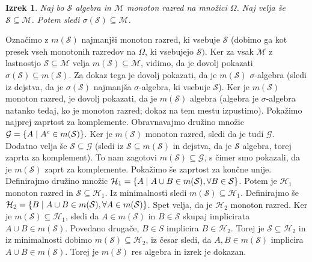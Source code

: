 \documentclass[12pt,a4paper]{amsart}
\theoremstyle{definition} %
\theoremstyle{plain} %
\newtheorem{izrek}[definicija]{Izrek}
\begin{document}
\begin{izrek} Naj bo $\mathcal{S}$ algebra in $\mathcal{M}$ monoton razred na množici $\Omega$. Naj velja še $\mathcal{S} \subseteq \mathcal{M}$. Potem sledi $\sigma{(\mathcal{S})} \subseteq \mathcal{M}$.
\end{izrek}
\proof
 Označimo z $m(\mathcal{S})$ najmanjši monoton razred, ki vsebuje $\mathcal{S}$ (dobimo ga kot presek vseh monotonih razredov na $\Omega$, ki vsebujejo $\mathcal{S}).$ Ker za vsak $\mathcal{M}$ z lastnostjo $\mathcal{S} \subseteq \mathcal{M}$ velja $m(\mathcal{S}) \subseteq \mathcal{M}$, vidimo, da je dovolj pokazati $\sigma(\mathcal{S}) \subseteq m(\mathcal{S})$. Za dokaz tega je dovolj pokazati, da je $m(\mathcal{S}) $ $\sigma$-algebra (sledi iz dejstva, da je $\sigma(\mathcal{S})$ najmanjša $\sigma$-algebra, ki vsebuje $\mathcal{S}$). Ker je $m(\mathcal{S})$ monoton razred, je dovolj pokazati, da je $m(\mathcal{S})$ algebra (algebra je $\sigma$-algebra natanko tedaj, ko je monoton razred; dokaz na tem mestu izpustimo). 
\newline
Pokažimo najprej zaprtost za komplemente. Obravnavajmo družino množic $\mathcal{G} = \{ A\hspace{0.1cm}|\hspace{0.1cm} A^c \in m(\mathcal{S})\}$.  Ker je $m(\mathcal{S})$ monoton razred, sledi da je tudi $\mathcal{G}$. Dodatno velja še $\mathcal{S} \subseteq \mathcal{G}$ (sledi iz $\mathcal{S} \subseteq m(\mathcal{S})$ in dejstva, da je $\mathcal{S}$ algebra, torej zaprta za komplement). To nam zagotovi $m(\mathcal{S}) \subseteq \mathcal{G}$, s čimer smo pokazali, da je $m(\mathcal{S})$ zaprt za komplemente.
\newline
Pokažimo še zaprtost za končne unije. Definirajmo družino množic $\mathcal{H}_1 = \{ A\hspace{0.1cm}|\hspace{0.1cm} A \cup B \in m(\mathcal{S}), \forall B \in \mathcal{S}\}$. Potem je $\mathcal{H}_1$ monoton razred in $\mathcal{S} \subseteq \mathcal{H}_1$. Iz minimalnosti sledi $m(\mathcal{S}) \subseteq \mathcal{H}_1$. Definirajmo še  $\mathcal{H}_2 = \{ B\hspace{0.1cm}|\hspace{0.1cm} A \cup B \in m(\mathcal{S}), \forall A \in m(\mathcal{S})\}$. Spet velja, da je $\mathcal{H}_2$ monoton razred. Ker je $m(\mathcal{S}) \subseteq \mathcal{H}_1$, sledi da $A \in m(\mathcal{S})$ in $B \in \mathcal{S}$ skupaj implicirata $A \cup B \in m(\mathcal{S})$. Povedano drugače, $B \in S$ implicira $B \in \mathcal{H}_2$. Torej je $\mathcal{S} \subseteq \mathcal{H}_2$  in iz minimalnosti dobimo $m(\mathcal{S}) \subseteq \mathcal{H}_2$, iz česar sledi, da $A,B \in m(\mathcal{S})$ implicira $A \cup B \in m(\mathcal{S})$. Torej je $m(\mathcal{S})$ res algebra in izrek je dokazan.
\end{document}
